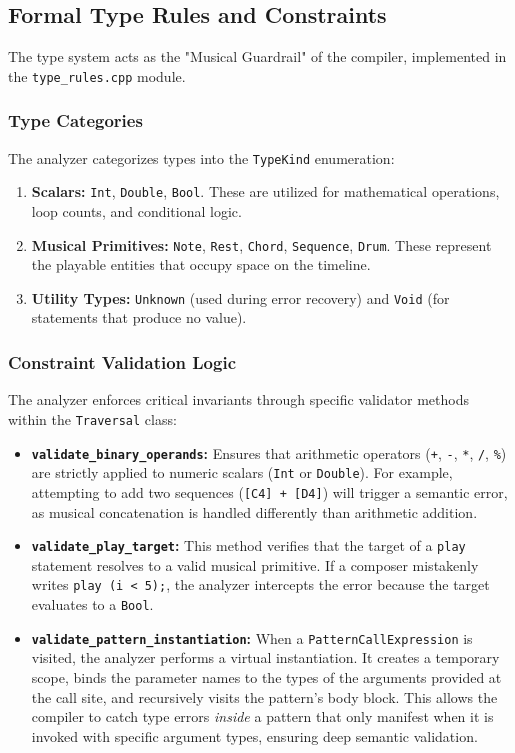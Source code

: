 \subsection{Formal Type Rules and Constraints}

The type system acts as the "Musical Guardrail" of the compiler, implemented in the \texttt{type\_rules.cpp} module.

\subsubsection{Type Categories}
The analyzer categorizes types into the \texttt{TypeKind} enumeration:
\begin{enumerate}
  \item \textbf{Scalars:} \texttt{Int}, \texttt{Double}, \texttt{Bool}. These are utilized for mathematical
    operations, loop counts, and conditional logic.
  \item \textbf{Musical Primitives:} \texttt{Note}, \texttt{Rest}, \texttt{Chord}, \texttt{Sequence},
    \texttt{Drum}. These represent the playable entities that occupy space on the timeline.
  \item \textbf{Utility Types:} \texttt{Unknown} (used during error recovery) and \texttt{Void} (for
    statements that produce no value).
\end{enumerate}

\subsubsection{Constraint Validation Logic}
The analyzer enforces critical invariants through specific validator methods within the \texttt{Traversal} class:

\begin{itemize}
  \item \textbf{\texttt{validate\_binary\_operands}:} Ensures that arithmetic operators (\texttt{+},
    \texttt{-}, \texttt{*}, \texttt{/}, \texttt{\%}) are strictly applied to numeric scalars (\texttt{Int} or
    \texttt{Double}). For example, attempting to add two sequences (\texttt{[C4] + [D4]}) will trigger a
    semantic error, as musical concatenation is handled differently than arithmetic addition.
  \item \textbf{\texttt{validate\_play\_target}:} This method verifies that the target of a \texttt{play}
    statement resolves to a valid musical primitive. If a composer mistakenly writes \texttt{play (i < 5);},
    the analyzer intercepts the error because the target evaluates to a \texttt{Bool}.
  \item \textbf{\texttt{validate\_pattern\_instantiation}:} When a \texttt{PatternCallExpression} is visited,
    the analyzer performs a virtual instantiation. It creates a temporary scope, binds the parameter names to
    the types of the arguments provided at the call site, and recursively visits the pattern's body block.
    This allows the compiler to catch type errors \textit{inside} a pattern that only manifest when it is
    invoked with specific argument types, ensuring deep semantic validation.
\end{itemize}
